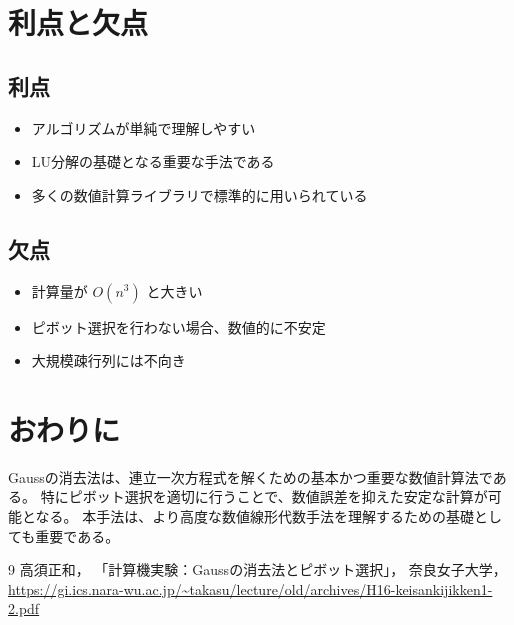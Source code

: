 \documentclass[a4paper,11pt]{article}
\begin{document}
\section{利点と欠点}
\subsection{利点}
\begin{itemize}
  \item アルゴリズムが単純で理解しやすい
  \item LU分解の基礎となる重要な手法である
  \item 多くの数値計算ライブラリで標準的に用いられている
\end{itemize}

\subsection{欠点}
\begin{itemize}
  \item 計算量が $O(n^3)$ と大きい
  \item ピボット選択を行わない場合、数値的に不安定
  \item 大規模疎行列には不向き
\end{itemize}

\section{おわりに}
Gaussの消去法は、連立一次方程式を解くための基本かつ重要な数値計算法である。
特にピボット選択を適切に行うことで、数値誤差を抑えた安定な計算が可能となる。
本手法は、より高度な数値線形代数手法を理解するための基礎としても重要である。

\begin{thebibliography}{9}
高須正和，
「計算機実験：Gaussの消去法とピボット選択」，
奈良女子大学，
\url{https://gi.ics.nara-wu.ac.jp/~takasu/lecture/old/archives/H16-keisankijikken1-2.pdf}
\end{thebibliography}
\end{document}
